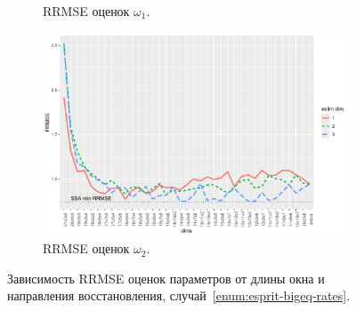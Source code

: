 \documentclass[specialist,
  substylefile=spbu.rtx,
subf,href,colorlinks=true, 12pt]{disser}
\theoremstyle{plain}
\theoremstyle{definition}
\theoremstyle{remark}
\begin{document}
\begin{figure}[!ht]
\begin{subfigure}{0.49\linewidth}
    \caption{RRMSE оценок $\omega_1$.}
    \label{fig:freq1_dims_large_eq_rates}
  \end{subfigure}
  \begin{subfigure}{0.49\linewidth}
    \includegraphics[width=\linewidth]{freq2_dims_large_eq_rates.pdf}
    \caption{RRMSE оценок $\omega_2$.}
    \label{fig:freq2_dims_large_eq_rates}
  \end{subfigure}
  \caption{Зависимость RRMSE оценок параметров от длины окна и направления восстановления,
  случай~\ref{enum:esprit-bigeq-rates}.}
  \label{fig:dims_large_eq_rates}
\end{figure}
\end{document}
